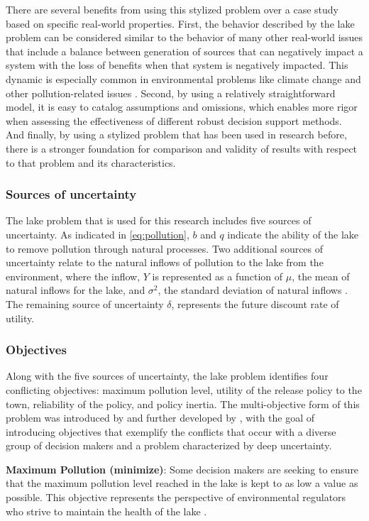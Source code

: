     There are several benefits from using this stylized problem over a case study based on specific real-world properties. First, the behavior described by the lake problem can be considered similar to the behavior of many other real-world issues that include a balance between generation of sources that can negatively impact a system with the loss of benefits when that system is negatively impacted. This dynamic is especially common in environmental problems like climate change and other pollution-related issues \citep{Carpenter1999}. Second, by using a relatively straightforward model, it is easy to catalog assumptions and omissions, which enables more rigor when assessing the effectiveness of different robust decision support methods. And finally, by using a stylized problem that has been used in research before, there is a stronger foundation for comparison and validity of results with respect to that problem and its characteristics. 

    \subsubsection{Sources of uncertainty}
    The lake problem that is used for this research includes five sources of uncertainty. As indicated in \cref{eq:pollution}, $b$ and $q$ indicate the ability of the lake to remove pollution through natural processes. Two additional sources of uncertainty relate to the natural inflows of pollution to the lake from the environment, where the inflow, $Y$ is represented as a function of $\mu$, the mean of natural inflows for the lake, and $\sigma^{2}$, the standard deviation of natural inflows \citep{Quinn2017}. The remaining source of uncertainty $\delta$, represents the future discount rate of utility. 

    \subsubsection{Objectives}
    Along with the five sources of uncertainty, the lake problem identifies four conflicting objectives: maximum pollution level, utility of the release policy to the town, reliability of the policy, and policy inertia. The multi-objective form of this problem was introduced by \citet{Singh2015} and further developed by \citet{Ward2015}, with the goal of introducing objectives that exemplify the conflicts that occur with a diverse group of decision makers and a problem characterized by deep uncertainty.
    
    \textbf{Maximum Pollution (minimize)}: Some decision makers are seeking to ensure that the maximum pollution level reached in the lake is kept to as low a value as possible. This objective represents the perspective of environmental regulators who strive to maintain the health of the lake \citep{Singh2015}.
    
